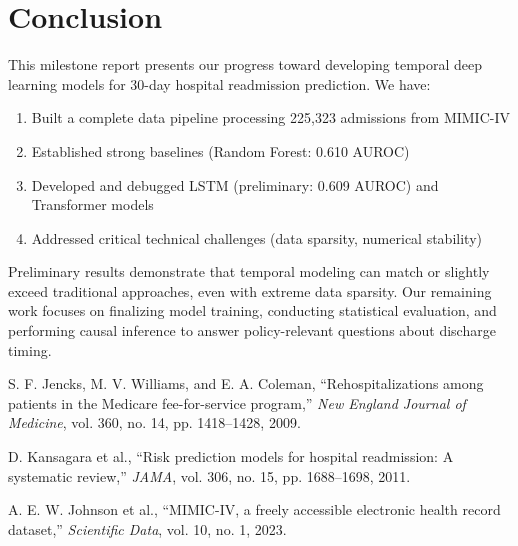 \documentclass[conference]{IEEEtran}
\begin{document}
\section{Conclusion}

This milestone report presents our progress toward developing temporal deep learning models for 30-day hospital readmission prediction. We have:
\begin{enumerate}
    \item Built a complete data pipeline processing 225,323 admissions from MIMIC-IV
    \item Established strong baselines (Random Forest: 0.610 AUROC)
    \item Developed and debugged LSTM (preliminary: 0.609 AUROC) and Transformer models
    \item Addressed critical technical challenges (data sparsity, numerical stability)
\end{enumerate}

Preliminary results demonstrate that temporal modeling can match or slightly exceed traditional approaches, even with extreme data sparsity. Our remaining work focuses on finalizing model training, conducting statistical evaluation, and performing causal inference to answer policy-relevant questions about discharge timing.


\begin{thebibliography}{9}

S. F. Jencks, M. V. Williams, and E. A. Coleman,
``Rehospitalizations among patients in the Medicare fee-for-service program,''
\textit{New England Journal of Medicine}, vol. 360, no. 14, pp. 1418--1428, 2009.

D. Kansagara et al.,
``Risk prediction models for hospital readmission: A systematic review,''
\textit{JAMA}, vol. 306, no. 15, pp. 1688--1698, 2011.

A. E. W. Johnson et al.,
``MIMIC-IV, a freely accessible electronic health record dataset,''
\textit{Scientific Data}, vol. 10, no. 1, 2023.

\end{thebibliography}
\end{document}

